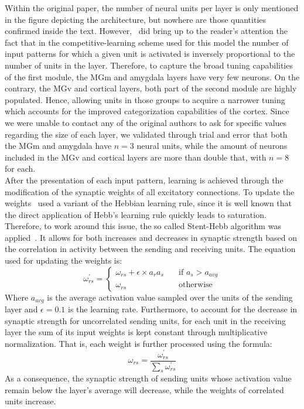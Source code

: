 Within the original paper, the number of neural units per layer is only mentioned in the figure depicting the architecture, but nowhere are those quantities confirmed inside the text. However,~\citet{Armony1995} did bring up to the reader's attention the fact that in the competitive-learning scheme used for this model the number of input patterns for which a given unit is activated is inversely proportional to the number of units in the layer. Therefore, to capture the broad tuning capabilities of the first module, the MGm and amygdala layers have very few neurons. On the contrary, the MGv and cortical layers, both part of the second module are highly populated. Hence, allowing units in those groups to acquire a narrower tuning which accounts for the improved categorization capabilities of the cortex. Since we were unable to contact any of the original authors to ask for specific values regarding the size of each layer, we validated through trial and error that both the MGm and amygdala have $n = 3$ neural units, while the amount of neurons included in the MGv and cortical layers are more than double that, with $n=8$ for each.\\

After the presentation of each input pattern, learning is achieved through the modification of the synaptic weights of all excitatory connections. To update the weights~\citet{Armony1995} used a variant of the Hebbian learning rule, since it is well known that the direct application of Hebb's learning rule quickly leads to saturation. Therefore, to work around this issue, the so called Stent-Hebb algorithm was applied~\supercite{stent_physiological_1973}. It allows for both increases and decreases in synaptic strength based on the correlation in activity between the sending and receiving units. The equation used for updating the weights is:
\begin{equation}\label{equ:hebb1}
   \omega^{\prime}_{rs} = 
   \begin{cases}
      \omega_{rs} + \epsilon \times a_{r} a_{s} & \quad \text{if } a_{s} > a_{avg}\\
      \omega_{rs} & \quad \text{otherwise}
   \end{cases}
\end{equation}
Where $a_{avg}$ is the average activation value sampled over the units of the sending layer and $\epsilon = 0.1$ is the learning rate. Furthermore, to account for the decrease in synaptic strength for uncorrelated sending units, for each unit in the receiving layer the sum of its input weights is kept constant through multiplicative normalization. That is, each weight is further processed using the formula:
\begin{equation}\label{equ:normal}
   \omega_{rs} = \frac{\omega^{\prime}_{rs}}{\sum_{s} \omega^{\prime}_{rs}}
\end{equation}
As a consequence, the synaptic strength of sending units whose activation value remain below the layer's average will decrease, while the weights of correlated units increase.\\

